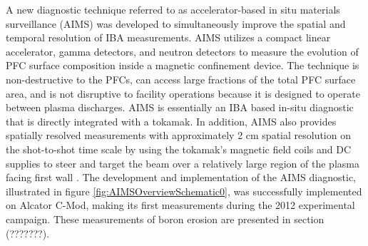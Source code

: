 \documentclass[final,3p,times,twocolumn]{elsarticle}
\begin{document}
A new diagnostic technique referred to as accelerator-based in situ materials surveillance (AIMS) was developed to simultaneously improve the spatial and temporal resolution of IBA measurements. AIMS utilizes a compact linear accelerator, gamma detectors, and neutron detectors to measure the evolution of PFC surface composition inside a magnetic confinement device. The technique is non-destructive to the PFCs, can access large fractions of the total PFC surface area, and is not disruptive to facility operations because it is designed to operate between plasma discharges. AIMS is essentially an IBA based in-situ diagnostic that is directly integrated with a tokamak. In addition, AIMS also provides spatially resolved measurements with approximately 2 cm spatial resolution on the shot-to-shot time scale by using the tokamak's magnetic field coils and DC supplies to steer and target the beam over a relatively large region of the plasma facing first wall \cite{RSIPaper}.  The development and implementation of the AIMS diagnostic, illustrated in figure \ref{fig:AIMSOverviewSchematic0}, was successfully implemented on Alcator C-Mod, making its first measurements during the 2012 experimental campaign. These measurements of boron erosion are presented in section (???????).
\end{document}
